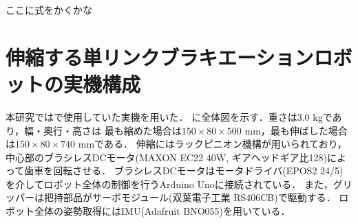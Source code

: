 

          ここに式をかくかな

        
        \section{伸縮する単リンクブラキエーションロボットの実機構成}
          
          本研究では\cite{Hijiri:Robomech2024}で使用していた実機を用いた．
          に全体図を示す．重さは3.0 kgであり，幅・奥行・高さは
          最も縮めた場合は$150{\times}80{\times}500$ mm，最も伸ばした場合は$150{\times}80{\times}740$ mmである．
          伸縮にはラックピニオン機構が用いられており，中心部のブラシレスDCモータ(MAXON EC22 40W, ギアヘッドギア比128)によって歯車を回転させる．
          ブラシレスDCモータはモータドライバ(EPOS2 24/5)を介してロボット全体の制御を行うArduino Unoに接続されている．
          また，グリッパーは把持部品がサーボモジュール(双葉電子工業 RS406CB)で駆動する．
          ロボット全体の姿勢取得にはIMU(Adafruit BNO055)を用いている．
          

            
          
